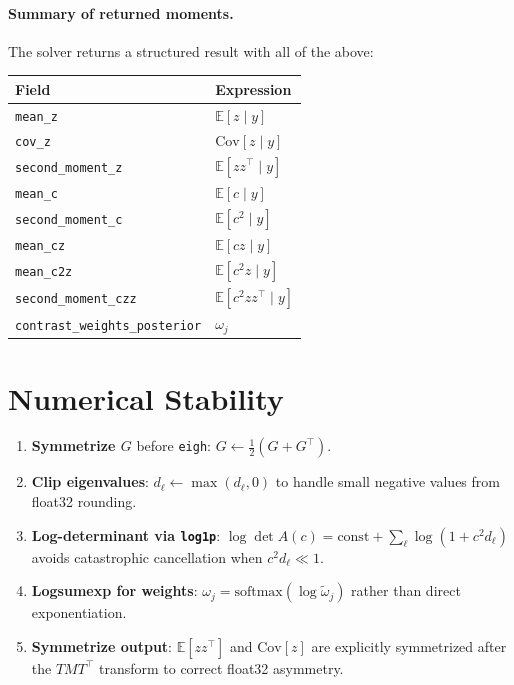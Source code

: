 \documentclass[11pt]{article}
\newcommand{\E}{\mathbb{E}}
\newcommand{\Cov}{\mathrm{Cov}}
\begin{document}
\paragraph{Summary of returned moments.}
The solver returns a structured result with all of the above:
\begin{center}
\begin{tabular}{ll}
\toprule
Field & Expression \\
\midrule
\texttt{mean\_z}              & $\E[z \mid y]$ \\
\texttt{cov\_z}               & $\Cov[z \mid y]$ \\
\texttt{second\_moment\_z}    & $\E[zz^\top \mid y]$ \\
\texttt{mean\_c}              & $\E[c \mid y]$ \\
\texttt{second\_moment\_c}    & $\E[c^2 \mid y]$ \\
\texttt{mean\_cz}             & $\E[cz \mid y]$ \\
\texttt{mean\_c2z}            & $\E[c^2 z \mid y]$ \\
\texttt{second\_moment\_czz}  & $\E[c^2 zz^\top \mid y]$ \\
\texttt{contrast\_weights\_posterior} & $\omega_j$ \\
\bottomrule
\end{tabular}
\end{center}

\section{Numerical Stability}
\label{sec:stability}

\begin{enumerate}
  \item \textbf{Symmetrize $G$} before \texttt{eigh}:
    $G \leftarrow \tfrac{1}{2}(G + G^\top)$.
  \item \textbf{Clip eigenvalues}: $d_\ell \leftarrow \max(d_\ell, 0)$
    to handle small negative values from float32 rounding.
  \item \textbf{Log-determinant via \texttt{log1p}}:
    $\log\det A(c) = \text{const} + \sum_\ell \log(1 + c^2 d_\ell)$
    avoids catastrophic cancellation when $c^2 d_\ell \ll 1$.
  \item \textbf{Logsumexp for weights}:
    $\omega_j = \mathrm{softmax}(\log\tilde{\omega}_j)$ rather than
    direct exponentiation.
  \item \textbf{Symmetrize output}: $\E[zz^\top]$ and $\Cov[z]$ are
    explicitly symmetrized after the $T M T^\top$ transform to correct
    float32 asymmetry.
\end{enumerate}
\end{document}
